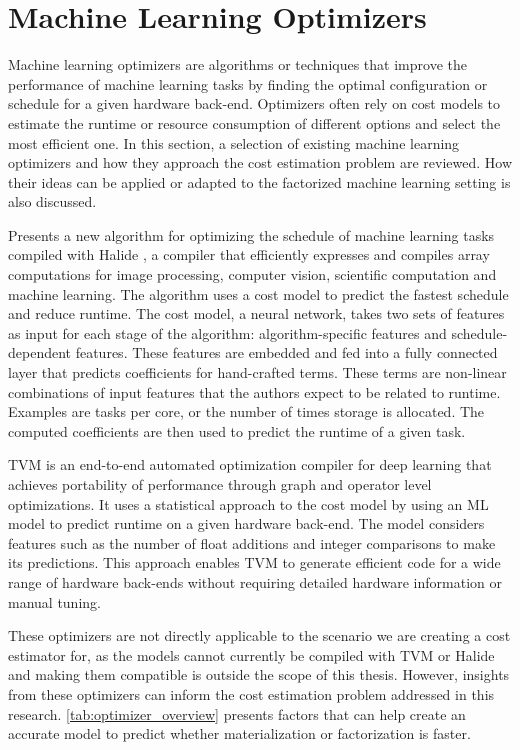 \section{Machine Learning Optimizers}
\label{sec:3-ml-optimizers}
Machine learning optimizers are algorithms or techniques that improve the performance of machine learning tasks by finding the optimal configuration or schedule for a given hardware back-end. Optimizers often rely on cost models to estimate the runtime or resource consumption of different options and select the most efficient one. In this section, a selection of existing machine learning optimizers and how they approach the cost estimation problem are reviewed. How their ideas can be applied or adapted to the factorized machine learning setting is also discussed.

\cite{halide_cost_model} Presents a new algorithm for optimizing the schedule of machine learning tasks compiled with Halide \cite{halide_examples}, a compiler that efficiently expresses and compiles array computations for image processing, computer vision, scientific computation and machine learning. The algorithm uses a cost model to predict the fastest schedule and reduce runtime. The cost model, a neural network, takes two sets of features as input for each stage of the algorithm: algorithm-specific features and schedule-dependent features. These features are embedded and fed into a fully connected layer that predicts coefficients for hand-crafted terms. These terms are non-linear combinations of input features that the authors expect to be related to runtime. Examples are tasks per core, or the number of times storage is allocated. The computed coefficients are then used to predict the runtime of a given task.

TVM \cite{tvm} is an end-to-end automated optimization compiler for deep learning that achieves portability of performance through graph and operator level optimizations. It uses a statistical approach to the cost model by using an ML model to predict runtime on a given hardware back-end. The model considers features such as the number of float additions and integer comparisons to make its predictions. This approach enables TVM to generate efficient code for a wide range of hardware back-ends without requiring detailed hardware information or manual tuning.

These optimizers are not directly applicable to the scenario we are creating a cost estimator for, as the models cannot currently be compiled with TVM or Halide and making them compatible is outside the scope of this thesis. However, insights from these optimizers can inform the cost estimation problem addressed in this research. \autoref{tab:optimizer_overview} presents factors that can help create an accurate model to predict whether materialization or factorization is faster.

